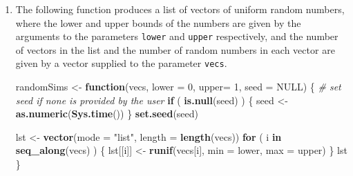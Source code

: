 \documentclass[]{book}
\makeatletter
\newenvironment{Shaded}{\begin{snugshade}}{\end{snugshade}}
\newcommand{\KeywordTok}[1]{\textcolor[rgb]{0.13,0.29,0.53}{\textbf{#1}}}
\newcommand{\DataTypeTok}[1]{\textcolor[rgb]{0.13,0.29,0.53}{#1}}
\newcommand{\DecValTok}[1]{\textcolor[rgb]{0.00,0.00,0.81}{#1}}
\newcommand{\StringTok}[1]{\textcolor[rgb]{0.31,0.60,0.02}{#1}}
\newcommand{\CommentTok}[1]{\textcolor[rgb]{0.56,0.35,0.01}{\textit{#1}}}
\newcommand{\OtherTok}[1]{\textcolor[rgb]{0.56,0.35,0.01}{#1}}
\newcommand{\ControlFlowTok}[1]{\textcolor[rgb]{0.13,0.29,0.53}{\textbf{#1}}}
\newcommand{\OperatorTok}[1]{\textcolor[rgb]{0.81,0.36,0.00}{\textbf{#1}}}
\newcommand{\NormalTok}[1]{#1}
\newenvironment{kframe}{%
\medskip{}
\setlength{\fboxsep}{.8em}
 \def\at@end@of@kframe{}%
 \ifinner\ifhmode%
  \def\at@end@of@kframe{\end{minipage}}%
  \begin{minipage}{\columnwidth}%
 \fi\fi%
 \def\FrameCommand##1{\hskip\@totalleftmargin \hskip-\fboxsep
 \colorbox{shadecolor}{##1}\hskip-\fboxsep
     \hskip-\linewidth \hskip-\@totalleftmargin \hskip\columnwidth}%
 \MakeFramed {\advance\hsize-\width
   \@totalleftmargin\z@ \linewidth\hsize
   \@setminipage}}%
 {\par\unskip\endMakeFramed%
 \at@end@of@kframe}
\renewenvironment{Shaded}{\begin{kframe}}{\end{kframe}}
\theoremstyle{definition}
\theoremstyle{definition}
\theoremstyle{definition}
\theoremstyle{remark}
\makeatother
\begin{document}
{\begin{enumerate}
  Refactor the following code so that it uses \texttt{Map()} instead of
  a loop:

\begin{Shaded}
\begin{Highlighting}[]
\NormalTok{df <-}\StringTok{ }\NormalTok{tigerstats}\OperatorTok{::}\NormalTok{m111survey}
\NormalTok{keepVariable <-}\StringTok{ }\KeywordTok{logical}\NormalTok{(}\KeywordTok{length}\NormalTok{(}\KeywordTok{names}\NormalTok{(df)))}
\ControlFlowTok{for}\NormalTok{ ( col }\ControlFlowTok{in} \KeywordTok{seq_along}\NormalTok{(keepVariable) ) \{}
\NormalTok{  var <-}\StringTok{ }\NormalTok{df[, col]}
\NormalTok{  isNumeric <-}\StringTok{ }\KeywordTok{is.numeric}\NormalTok{(var)}
\NormalTok{  allThere <-}\StringTok{ }\OperatorTok{!}\KeywordTok{any}\NormalTok{(}\KeywordTok{is.na}\NormalTok{(var))}
\NormalTok{  keepVariable[col] <-}\StringTok{ }\NormalTok{isNumeric }\OperatorTok{&&}\StringTok{ }\NormalTok{allThere}
\NormalTok{\}}
\NormalTok{newFrame <-}\StringTok{ }\NormalTok{df[, keepVariable]}
\KeywordTok{head}\NormalTok{(newFrame)}
\end{Highlighting}
\end{Shaded}
\item
  The following function produces a list of vectors of uniform random
  numbers, where the lower and upper bounds of the numbers are given by
  the arguments to the parameters \texttt{lower} and \texttt{upper}
  respectively, and the number of vectors in the list and the number of
  random numbers in each vector are given by a vector supplied to the
  parameter \texttt{vecs}.

\begin{Shaded}
\begin{Highlighting}[]
\NormalTok{randomSims <-}\StringTok{ }\ControlFlowTok{function}\NormalTok{(vecs, }\DataTypeTok{lower =} \DecValTok{0}\NormalTok{, }\DataTypeTok{upper=} \DecValTok{1}\NormalTok{, }\DataTypeTok{seed =} \OtherTok{NULL}\NormalTok{) \{}
  \CommentTok{# set seed if none is provided by the user}
  \ControlFlowTok{if}\NormalTok{ ( }\KeywordTok{is.null}\NormalTok{(seed) ) \{}
\NormalTok{    seed <-}\StringTok{ }\KeywordTok{as.numeric}\NormalTok{(}\KeywordTok{Sys.time}\NormalTok{())}
\NormalTok{  \}}
  \KeywordTok{set.seed}\NormalTok{(seed)}

\NormalTok{  lst <-}\StringTok{ }\KeywordTok{vector}\NormalTok{(}\DataTypeTok{mode =} \StringTok{"list"}\NormalTok{, }\DataTypeTok{length =} \KeywordTok{length}\NormalTok{(vecs))}
  \ControlFlowTok{for}\NormalTok{ ( i }\ControlFlowTok{in} \KeywordTok{seq_along}\NormalTok{(vecs) ) \{}
\NormalTok{    lst[[i]] <-}\StringTok{ }\KeywordTok{runif}\NormalTok{(vecs[i], }\DataTypeTok{min =}\NormalTok{ lower, }\DataTypeTok{max =}\NormalTok{ upper)}
\NormalTok{  \}}
\NormalTok{  lst}
\NormalTok{\}}
\end{Highlighting}
\end{Shaded}


\end{enumerate}}
\end{document}
